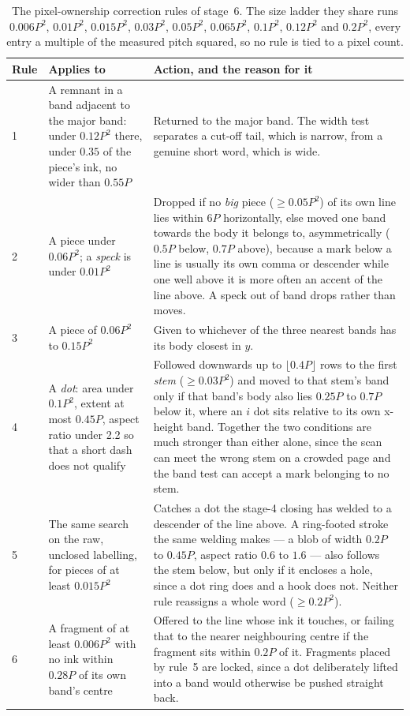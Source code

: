 \begin{table}[h]
\centering
\fontsize{8.5}{10.2}\selectfont
\setlength{\tabcolsep}{4pt}
\begin{tabularx}{\linewidth}{|p{0.7cm}|p{3.6cm}|X|}
\hline
\textbf{Rule} & \textbf{Applies to} & \textbf{Action, and the reason for it} \\
\hline
1 & A remnant in a band adjacent to the major band: under $0.12P^2$ there, under $0.35$ of the piece's ink, no wider than $0.55P$ & Returned to the major band. The width test separates a cut-off tail, which is narrow, from a genuine short word, which is wide. \\
\hline
2 & A piece under $0.06P^2$; a \emph{speck} is under $0.01P^2$ & Dropped if no \emph{big} piece ($\ge0.05P^2$) of its own line lies within $6P$ horizontally, else moved one band towards the body it belongs to, asymmetrically ($0.5P$ below, $0.7P$ above), because a mark below a line is usually its own comma or descender while one well above it is more often an accent of the line above. A speck out of band drops rather than moves. \\
\hline
3 & A piece of $0.06P^2$ to $0.15P^2$ & Given to whichever of the three nearest bands has its body closest in $y$. \\
\hline
4 & A \emph{dot}: area under $0.1P^2$, extent at most $0.45P$, aspect ratio under 2.2 so that a short dash does not qualify & Followed downwards up to $\lfloor0.4P\rfloor$ rows to the first \emph{stem} ($\ge0.03P^2$) and moved to that stem's band only if that band's body also lies $0.25P$ to $0.7P$ below it, where an $i$ dot sits relative to its own x-height band. Together the two conditions are much stronger than either alone, since the scan can meet the wrong stem on a crowded page and the band test can accept a mark belonging to no stem. \\
\hline
5 & The same search on the raw, unclosed labelling, for pieces of at least $0.015P^2$ & Catches a dot the stage-4 closing has welded to a descender of the line above. A ring-footed stroke the same welding makes --- a blob of width $0.2P$ to $0.45P$, aspect ratio $0.6$ to $1.6$ --- also follows the stem below, but only if it encloses a hole, since a dot ring does and a hook does not. Neither rule reassigns a whole word ($\ge0.2P^2$). \\
\hline
6 & A fragment of at least $0.006P^2$ with no ink within $0.28P$ of its own band's centre & Offered to the line whose ink it touches, or failing that to the nearer neighbouring centre if the fragment sits within $0.2P$ of it. Fragments placed by rule~5 are locked, since a dot deliberately lifted into a band would otherwise be pushed straight back. \\
\hline
\end{tabularx}
\caption{The pixel-ownership correction rules of stage~6. The size ladder they share runs $0.006P^2$, $0.01P^2$, $0.015P^2$, $0.03P^2$, $0.05P^2$, $0.065P^2$, $0.1P^2$, $0.12P^2$ and $0.2P^2$, every entry a multiple of the measured pitch squared, so no rule is tied to a pixel count.}
\label{tab:seg-own}
\end{table}

